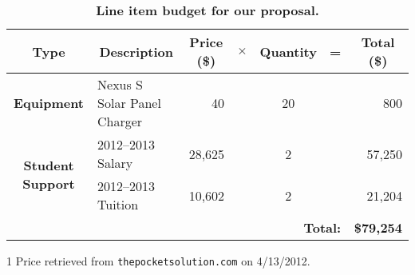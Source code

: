 \renewcommand*\arraystretch{1.2}
\begin{table}[h]
\begin{threeparttable}
{\normalsize
\begin{tabularx}{\textwidth}{cXrcccr}

\multicolumn{1}{c}{\textbf{\large{Type}}} &
\multicolumn{1}{c}{\textbf{\large{Description}}} &
\multicolumn{1}{c}{\textbf{\large{Price (\$)}}} &
$\times$ &
\multicolumn{1}{c}{\textbf{\large{Quantity}}} &
= &
\multicolumn{1}{c}{\textbf{\large{Total (\$)}}} \\ \toprule 

\textbf{Equipment} &
Nexus S Solar Panel Charger &
40\tnote{1} &
&
20 &
&
800 \\ \midrule

\multirow{2}{*}{\textbf{Student Support}} &
2012--2013 Salary &
28,625 &
&
2 &
&
57,250 \\

& 2012--2013 Tuition &
10,602 &
&
2 &
&
21,204 \\ \midrule

\multicolumn{6}{r}{\textbf{\large Total:}} &
\textbf{{\large \$79,254}}

\end{tabularx}
}
{\footnotesize
\begin{tablenotes}
\item [1] Price retrieved from \texttt{thepocketsolution.com} on 4/13/2012.
\end{tablenotes}
}
\caption{\textbf{Line item budget for our proposal.}}
\end{threeparttable}
\label{table-budget}
\end{table}
